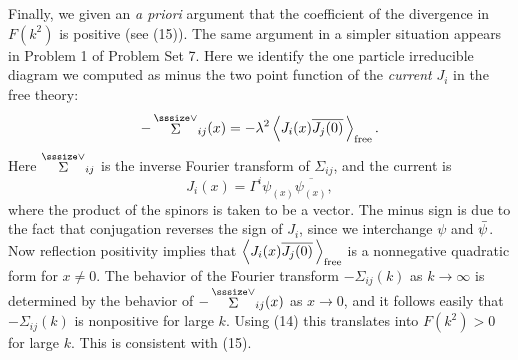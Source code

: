 Finally, we given an {\it a priori} argument that the
coefficient of the divergence in $F(k^2)$ is positive
(see (15)).
The same argument in a simpler situation appears in
Problem 1 of Problem Set 7.
Here we identify the one particle irreducible diagram we
computed as minus the two point function of the {\it current}
$J_i$ in the free theory:
$$
-\mathop{\mathop{\Sigma}\limits^{\sssize\vee}}
\nolimits_{ij}(x) =-\lam^2
\left<J_i(x)\overline{J_j(0)}\,\right>_{\free}.
$$
Here $\mathop{\mathop{\Sigma}\limits^{\sssize\vee}}\nolimits_{ij}$
is the inverse Fourier transform of $\Sigma_{ij}$, and the
current is
$$
J_i(x)=\Gamma^i\psi_{(x)}\overline{\psi_{(x)}},
$$
where the product of the spinors is taken to be a vector.
The minus sign is due to the fact that
conjugation reverses the sign of $J_i$, since
we interchange $\psi$ and $\bar{\psi}$. 
Now reflection positivity implies that
$\left<J_i(x)\overline{J_j(0)}\,\right>_{\text{\rm free}}$
is a nonnegative quadratic form for $x\not=0$.
The behavior of the Fourier transform
$-\Sigma_{ij}(k)$ as $k\to\infty$ is determined by the
behavior of $-\mathop{\mathop{\Sigma}\limits^{\sssize\vee}}
\nolimits_{ij}(x)$ as $x\to 0$, and it follows easily
that $-\Sigma_{ij}(k)$ is nonpositive for large $k$.
Using (14) this translates into $F(k^2)>0$ for large
$k$.
This is consistent with (15).



\enddocument




